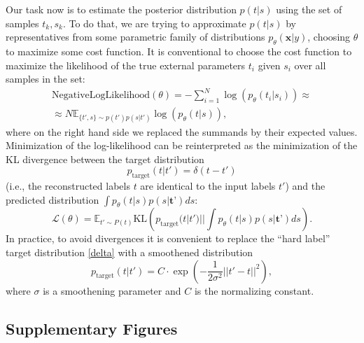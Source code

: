 \documentclass{article}
\theoremstyle{plain}
\theoremstyle{definition}
\theoremstyle{remark}
\begin{document}
Our task now is to estimate the posterior distribution $p(t|s)$  using the set of samples $t_k, s_{k}$. To do that, we are trying to approximate $p(t|s)$ by representatives from some parametric family of distributions $p_{\theta}(\textbf{x}|y)$, choosing $\theta$ to maximize some cost function. It is conventional to choose the cost function  to maximize the likelihood of the true external parameters $t_{i}$ given $s_{i}$ over all samples in the set:
\begin{equation}
\begin{split}
    \text{NegativeLogLikelihood}(\theta) = -\sum_{i=1}^{N}\log(p_{\theta}(t_{i}|s_{i})) \approx \\ \approx N \mathbb{E}_{\{t',s\} \sim p(t')p(s|t')} \log(p_{\theta}(t|s)),
\end{split}
    \label{neg_log_likelihood}
\end{equation}
where on the right hand side we replaced the summands by their expected values. 
Minimization of the log-likelihood can be reinterpreted as the minimization of the KL divergence between the target distribution 
\begin{equation}
    p_{\text{target}}(t|t') = \delta (t-t')
    \label{delta}
\end{equation} 
(i.e., the reconstructed labels $t$ are identical to the input labels $t'$) and the predicted distribution $\int p_{\theta}(t|s)p(s|\textbf{t'})ds$:
\begin{equation}
    \mathcal{L}(\theta) = \mathbb{E}_{t' \sim P(t)} \text{KL}\left(p_{\text{target}}(t|t')|| \int p_{\theta}(t|s)p(s|\textbf{t'})ds\right).
\label{costfunction}
\end{equation}
In practice, to avoid divergences it is convenient to replace the ``hard label'' target distribution \eqref{delta} with a smoothened distribution 
\begin{equation}
    p_{\text{target}} (t|t') = C \cdot \exp\left(-\frac{1}{2 \sigma^{2}}||t'-t||^{2}\right),
    \label{smoothed_target}
\end{equation}
where $\sigma$ is a smoothening parameter and $C$ is the normalizing constant.


\subsection{Supplementary Figures}
\label{subsec:supp_figs}
\end{document}
